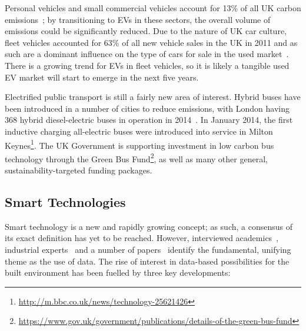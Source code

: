 \documentclass[conference]{IEEEtran}
\begin{document}
Personal vehicles and small commercial vehicles account for 13\% of
all UK carbon emissions~\cite{lumsden:2012}; by transitioning to EVs
in these sectors, the overall volume of emissions could be
significantly reduced.  Due to the nature of UK car culture, fleet
vehicles accounted for 63\% of all new vehicle sales in the UK in 2011
and as such are a dominant influence on the type of cars for sale in
the used market~\cite{fleets:2012}. There is a growing trend for EVs
in fleet vehicles, so it is likely a tangible used EV market will
start to emerge in the next five years.

Electrified public transport is still a fairly new area of
interest. Hybrid buses have been introduced in a number of cities to
reduce emissions, with London having 368 hybrid diesel-electric buses
in operation in 2014~\cite{tfl:2009}. In January 2014, the first
inductive charging all-electric buses were introduced into
service in Milton
Keynes\footnote{\url{http://m.bbc.co.uk/news/technology-25621426}}. The
UK Government is supporting investment in low carbon bus technology
through the Green Bus
Fund\footnote{\url{https://www.gov.uk/government/publications/details-of-the-green-bus-fund}},
as well as many other general, sustainability-targeted funding
packages.

\subsection{Smart Technologies}

Smart technology is a new and rapidly growing concept; as such, a
consensus of its exact definition has yet to be reached. However,
interviewed academics~\cite{elecgen:2013}, industrial
experts~\cite{buscher:2014} and a number of
papers~\cite{komninos:2002,arup-et-al:2011,harrison+abbottdonnelly:2011,batty-et-al:2012}
identify the fundamental, unifying theme as the use of data. The rise
of interest in data-based possibilities for the built environment has
been fuelled by three key developments:
\end{document}
